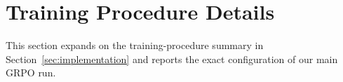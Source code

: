 \documentclass[11pt]{article}
\begin{document}



\section{Training Procedure Details}
\label{app:training}
This section expands on the training-procedure summary in Section~\ref{sec:implementation} and reports the exact configuration of our main GRPO run.
\end{document}
